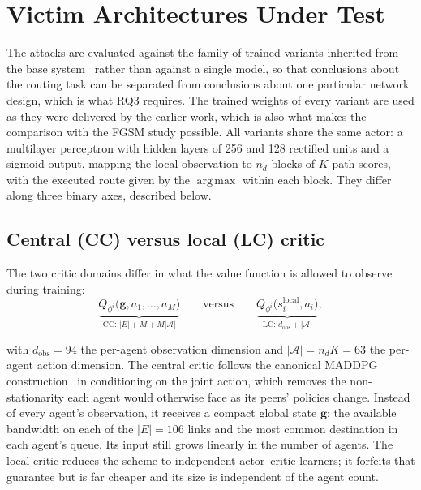 \section{Victim Architectures Under Test}
\label{sec:victim_architectures}

The attacks are evaluated against the family of trained variants inherited from the
base system~\cite{amaral2026maddpg-routing} rather than against a single model, so
that conclusions about the routing task can be separated from conclusions about one
particular network design, which is what RQ3 requires. The trained weights of every
variant are used as they were delivered by the earlier work, which is also what makes
the comparison with the FGSM study possible. All variants share the same actor: a
multilayer perceptron with hidden layers of 256 and 128 rectified units and a sigmoid
output, mapping the local observation to $n_d$ blocks of $K$ path scores, with the
executed route given by the $\operatorname{arg\,max}$ within each block. They differ along three binary
axes, described below.

\subsection{Central (CC) versus local (LC) critic}
\label{subsec:axis_critic_domain}

The two critic domains differ in what the value function is allowed to observe
during training:
\begin{equation}
  \underbrace{Q_{\phi^i}\big(\mathbf{g}, a_1, \dots, a_M\big)}_{\text{CC:\ } |E| + M + M|\mathcal{A}|}
  \qquad\text{versus}\qquad
  \underbrace{Q_{\phi^i}\big(s^{\text{local}}_i, a_i\big)}_{\text{LC:\ } d_{\text{obs}} + |\mathcal{A}|},
  \label{eq:arch_critic_domains}
\end{equation}

\noindent with $d_{\text{obs}} = 94$ the per-agent observation dimension and
$|\mathcal{A}| = n_d K = 63$ the per-agent action dimension. The central critic follows
the canonical MADDPG construction~\cite{lowe2017multi} in conditioning on the joint
action, which removes the non-stationarity each agent would otherwise face as its
peers' policies change. Instead of every agent's observation, it receives a compact
global state $\mathbf{g}$: the available bandwidth on each of the $|E| = 106$ links and
the most common destination in each agent's queue. Its input still grows linearly in the
number of agents. The local critic reduces the scheme to independent actor--critic
learners; it forfeits that guarantee but is far cheaper and its size is independent of
the agent count.


